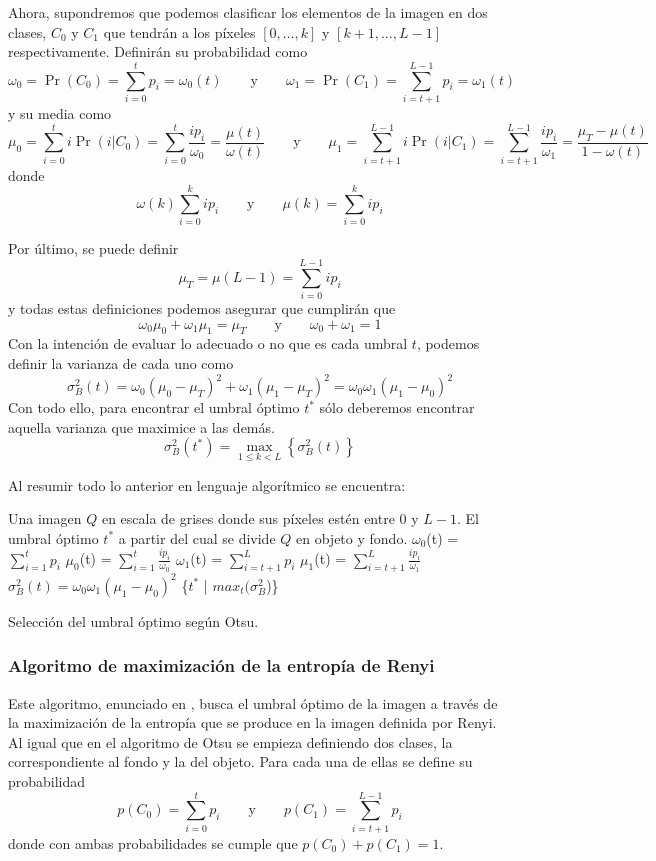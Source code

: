 Ahora, supondremos que podemos clasificar los elementos de la imagen en dos clases, $C_0$ y $C_1$ que tendrán a los píxeles $[0,\dots,k]$ y $[k+1,\dots,L-1]$ respectivamente. Definirán su probabilidad como
$$\omega_0 = \Pr(C_0) = \sum_{i=0}^{t}p_i=\omega_0(t)\qquad\text{y}\qquad
\omega_1 = \Pr(C_1) = \sum_{i=t+1}^{L-1}p_i=\omega_1(t)$$
y su media como
$$\mu_0=\sum_{i=0}^t i \Pr(i|C_0) = \sum_{i=0}^t \frac{ip_i}{\omega_0} = \frac{\mu(t)}{\omega(t)}\qquad\text{y}\qquad
\mu_1=\sum_{i=t+1}^{L-1} i \Pr(i|C_1) = \sum_{i=t+1}^{L-1} \frac{ip_i}{\omega_1} = \frac{\mu_T-\mu(t)}{1-\omega(t)}$$
donde
$$\omega(k)\sum_{i=0}^k ip_i   \qquad\text{y}\qquad   \mu(k)=\sum_{i=0}^k ip_i$$

Por último, se puede definir
$$\mu_T = \mu(L-1) = \sum_{i=0}^{L-1} ip_i$$
y todas estas definiciones podemos asegurar que cumplirán que
$$\omega_0\mu_0+\omega_1\mu_1 = \mu_T   \qquad\text{y}\qquad   \omega_0+\omega_1 = 1$$
Con la intención de evaluar lo adecuado o no que es cada umbral $t$, podemos definir la varianza de cada uno como 
$$\sigma_B^2(t) = \omega_0(\mu_0-\mu_T)^2 + \omega_1(\mu_1-\mu_T)^2 = \omega_0\omega_1(\mu_1-\mu_0)^2$$
Con todo ello, para encontrar el umbral óptimo $t^*$ sólo deberemos encontrar aquella varianza que maximice a las demás. 
$$\sigma_B^2(t^*) = \max_{1\leq k <L}\left\{\sigma_B^2(t)\right\}$$

Al resumir todo lo anterior en lenguaje algorítmico se encuentra:

\begin{algorithm}
\begin{algorithmic}[1]
\REQUIRE Una imagen $Q$ en escala de grises donde sus píxeles estén entre $0$ y $L-1$.
\ENSURE El umbral óptimo $t^*$ a partir del cual se divide $Q$ en objeto y fondo.
\STATE $\omega_0$(t) = $\sum_{i=1}^{t}p_i$
\STATE $\mu_0$(t) = $\sum_{i=1}^t \frac{ip_i}{\omega_0}$
\STATE $\omega_1$(t) = $\sum_{i=t+1}^{L}p_i$
\STATE $\mu_1$(t) = $\sum_{i=t+1}^L \frac{ip_i}{\omega_1}$
\STATE $\sigma_B^2(t) = \omega_0\omega_1(\mu_1-\mu_0)^2$
\ENDFOR
\RETURN \{$t^*$ | $max_t(\sigma_B^2$)\}
\end{algorithmic}
\caption{Selección del umbral óptimo según Otsu.}\label{alg:otsu}
\end{algorithm}


\subsubsection{Algoritmo de maximización de la entropía de Renyi}\label{sec:algoritmorenyi}
Este algoritmo, enunciado en \cite{art:sahoo}, busca el umbral óptimo de la imagen a través de la maximización de la entropía que se produce en la imagen definida por Renyi. Al igual que en el algoritmo de Otsu se empieza definiendo dos clases, la correspondiente al fondo y la del objeto. Para cada una de ellas se define su probabilidad
$$p(C_0)=\sum_{i=0}^{t}p_i\qquad\text{y}\qquad p(C_1)=\sum_{i=t+1}^{L-1}p_i$$
donde con ambas probabilidades se cumple que $p(C_0)+p(C_1)=1$.

